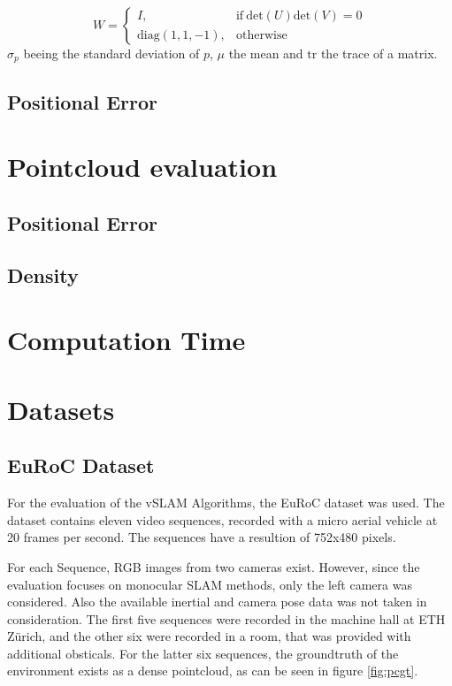 	$$ W = \begin{cases}
      I, & \text{if}\ \text{det}\left(U\right)\text{det}\left(V\right) =0 \\
      \text{diag}\left(1,1,-1\right), & \text{otherwise}
    \end{cases}$$
	$\sigma_p$ beeing the standard deviation of $p$, $\mu$ the mean and $\text{tr}$ the trace of a matrix. 
	
	\subsection{Positional Error}
	
\section{Pointcloud evaluation}

	\subsection{Positional Error}
	
	\subsection{Density}
	

\section{Computation Time}
	

\section{Datasets}

	\subsection{EuRoC Dataset}

	For the evaluation of the vSLAM Algorithms, the EuRoC dataset \cite{euroc} was used.
	The dataset contains eleven video sequences, recorded with a micro aerial vehicle at 20 frames per second.
	The sequences have a resultion of 752x480 pixels.
	
	For each Sequence, RGB images from two cameras exist. However, since the evaluation
	focuses on monocular SLAM methods, only the left camera was considered. Also the available 
	inertial and camera pose data was not taken in consideration. The first five sequences were recorded in 
	the machine hall at ETH Zürich, and the other six were recorded in a room, that was provided 
	with additional obsticals. For the latter six sequences, the groundtruth of the environment 
	exists as a dense pointcloud, as can be seen in figure \ref{fig:pcgt}.

